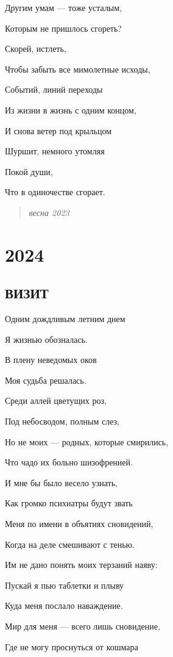 \documentclass[
  a5paperpaper,
  DIV=11,
  numbers=noendperiod]{scrreprt}
\begin{document}
Другим умам --- тоже усталым,

Которым не пришлось сгореть?

Скорей, истлеть,

Чтобы забыть все мимолетные исходы,

Событий, линий переходы

Из жизни в жизнь с одним концом,

И снова ветер под крыльцом

Шуршит, немного утомляя

Покой души,

Что в одиночестве сгорает.

\begin{quote}
\emph{весна 2023}
\end{quote}


\chapter{2024}\label{section-19}

\section{ВИЗИТ}\label{ux432ux438ux437ux438ux442}

Одним дождливым летним днем

Я жизнью обозналась.

В плену неведомых оков

Моя судьба решалась.

Среди аллей цветущих роз,

Под небосводом, полным слез,

Но не моих --- родных, которые смирились,

Что чадо их больно шизофренией.

И мне бы было весело узнать,

Как громко психиатры будут звать

Меня по имени в объятиях сновидений,

Когда на деле смешивают с тенью.

Им не дано понять моих терзаний наяву:

Пускай я пью таблетки и плыву

Куда меня послало наваждение.

Мир для меня --- всего лишь сновидение,

Где не могу проснуться от кошмара
\end{document}
